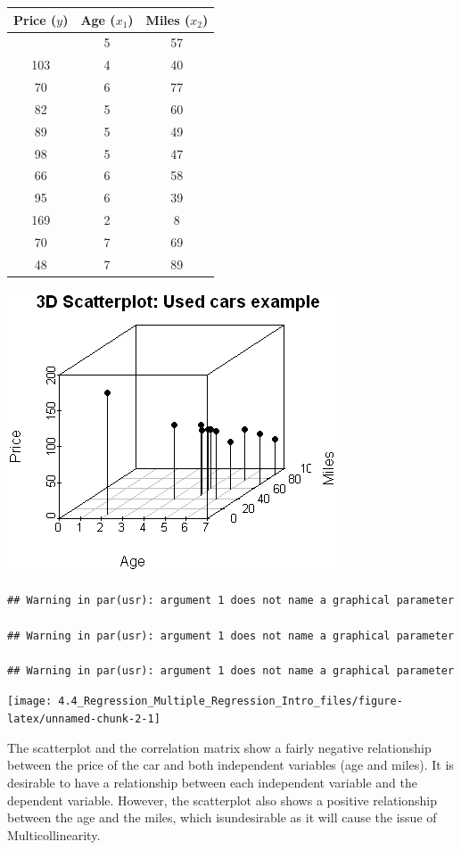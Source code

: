 \documentclass[
]{article}
\begin{document}
\begin{longtable}[]{@{}ccc@{}}
\toprule\noalign{}
Price (\(y\)) & Age (\(x_1\)) & Miles (\(x_2\)) \\
\midrule\noalign{}
\endhead
\bottomrule\noalign{}
\endlastfoot
85 & 5 & 57 \\
103 & 4 & 40 \\
70 & 6 & 77 \\
82 & 5 & 60 \\
89 & 5 & 49 \\
98 & 5 & 47 \\
66 & 6 & 58 \\
95 & 6 & 39 \\
169 & 2 & 8 \\
70 & 7 & 69 \\
48 & 7 & 89 \\
\end{longtable}

\begin{center}\includegraphics[width=0.4\linewidth,height=0.4\textheight]{figures/3d1} \end{center}

\begin{verbatim}
## Warning in par(usr): argument 1 does not name a graphical parameter

## Warning in par(usr): argument 1 does not name a graphical parameter

## Warning in par(usr): argument 1 does not name a graphical parameter
\end{verbatim}

\begin{center}\texttt{[image: 4.4\_Regression\_Multiple\_Regression\_Intro\_files/figure-latex/unnamed-chunk-2-1]} \end{center}

The scatterplot and the correlation matrix show a fairly negative
relationship between the price of the car and both independent variables
(age and miles). It is desirable to have a relationship between each
independent variable and the dependent variable. However, the
scatterplot also shows a positive relationship between the age and the
miles, which isundesirable as it will cause the issue of
Multicollinearity.
\end{document}
